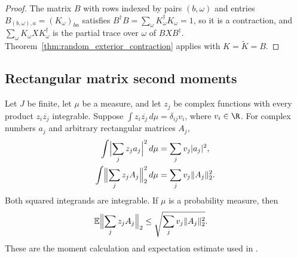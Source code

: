\begin{proof}\leanok
    The matrix $B$ with rows indexed by pairs $(b,\omega)$ and entries
    $B_{(b,\omega),a}=(K_\omega)_{ba}$ satisfies
    $B^\dagger B=\sum_\omega K_\omega^\dagger K_\omega=1$, so it is a contraction, and
    $\sum_\omega K_\omega XK_\omega^\dagger$ is the partial trace over $\omega$ of $BXB^\dagger$.
    Theorem~\ref{thm:random_exterior_contraction} applies with $K=\widetilde K=B$.
\end{proof}

\subsection{Rectangular matrix second moments}

\begin{theorem}
    \label{thm:random_matrix_moments}
    \leanok
    Let $J$ be finite, let $\mu$ be a measure, and let $z_j$ be complex
    functions with every product $z_i\overline{z_j}$ integrable. Suppose
    $\int z_i\overline{z_j}\,d\mu=\delta_{ij}v_i$, where $v_i\in\R$.
    For complex numbers $a_j$ and arbitrary rectangular matrices $A_j$,
    \begin{align}
        \int\Bigl|\sum_j z_j a_j\Bigr|^2\,d\mu
         & =\sum_j v_j|a_j|^2,
        \label{eq:random_scalar_moment}     \\
        \int\Bigl\lVert\sum_j z_j A_j\Bigr\rVert_2^2\,d\mu
         & =\sum_j v_j\lVert A_j\rVert_2^2.
        \label{eq:random_matrix_moment}
    \end{align}
    Both squared integrands are integrable. If $\mu$ is a probability
    measure, then
    \begin{align}
        \mathbb E\Bigl\lVert\sum_j z_j A_j\Bigr\rVert_2
         & \leq\sqrt{\sum_j v_j\lVert A_j\rVert_2^2}.
        \label{eq:random_mean_norm}
    \end{align}
    These are the moment calculation and expectation estimate used in
    \cite[Equations~(5.16) and~(5.18)]{OpenAI2026PolynomialPEPS}.
\end{theorem}

